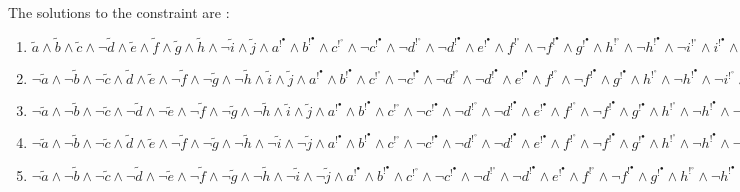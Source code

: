 \begin{BehExample}
The solutions to the constraint are :

\begin{enumerate}
\item $\tilde{a} \wedge \tilde{b} \wedge \tilde{c} \wedge \neg \tilde{d} \wedge \tilde{e} \wedge \tilde{f} \wedge \tilde{g} \wedge \tilde{h} \wedge \neg \tilde{i} \wedge \tilde{j} \wedge a^{!^\bullet} \wedge b^{!^\bullet} \wedge c^{!^\circ} \wedge \neg c^{!^\bullet} \wedge \neg d^{!^\circ} \wedge \neg d^{!^\bullet} \wedge e^{!^\bullet} \wedge f^{!^\circ} \wedge \neg f^{!^\bullet} \wedge g^{!^\bullet} \wedge h^{!^\circ} \wedge \neg h^{!^\bullet} \wedge \neg i^{!^\circ} \wedge i^{!^\bullet} \wedge j^{!^\bullet}$
\item $\neg \tilde{a} \wedge \neg \tilde{b} \wedge \neg \tilde{c} \wedge \tilde{d} \wedge \tilde{e} \wedge \neg \tilde{f} \wedge \neg \tilde{g} \wedge \neg \tilde{h}  \wedge \tilde{i} \wedge \tilde{j}  \wedge a^{!^\bullet} \wedge b^{!^\bullet} \wedge c^{!^\circ} \wedge \neg c^{!^\bullet} \wedge \neg d^{!^\circ} \wedge \neg d^{!^\bullet} \wedge e^{!^\bullet} \wedge f^{!^\circ} \wedge \neg f^{!^\bullet} \wedge g^{!^\bullet} \wedge h^{!^\circ} \wedge \neg h^{!^\bullet} \wedge \neg i^{!^\circ} \wedge i^{!^\bullet} \wedge j^{!^\bullet} \wedge a^{c^\triangleright}$
\item $\neg \tilde{a} \wedge \neg \tilde{b} \wedge \neg \tilde{c} \wedge \neg \tilde{d} \wedge \neg \tilde{e} \wedge \neg \tilde{f} \wedge \neg \tilde{g} \wedge \neg \tilde{h} \wedge \tilde{i} \wedge \tilde{j}  \wedge a^{!^\bullet} \wedge b^{!^\bullet} \wedge c^{!^\circ} \wedge \neg c^{!^\bullet} \wedge \neg d^{!^\circ} \wedge \neg d^{!^\bullet} \wedge e^{!^\bullet} \wedge f^{!^\circ} \wedge \neg f^{!^\bullet} \wedge g^{!^\bullet} \wedge h^{!^\circ} \wedge \neg h^{!^\bullet} \wedge \neg i^{!^\circ} \wedge i^{!^\bullet} \wedge j^{!^\bullet} \wedge a^{c^\triangleright}$
\item $\neg \tilde{a} \wedge \neg \tilde{b} \wedge \neg \tilde{c} \wedge \tilde{d} \wedge \tilde{e} \wedge \neg \tilde{f} \wedge \neg \tilde{g} \wedge \neg \tilde{h} \wedge \neg \tilde{i} \wedge \neg \tilde{j}  \wedge a^{!^\bullet} \wedge b^{!^\bullet} \wedge c^{!^\circ} \wedge \neg c^{!^\bullet} \wedge \neg d^{!^\circ} \wedge \neg d^{!^\bullet} \wedge e^{!^\bullet} \wedge f^{!^\circ} \wedge \neg f^{!^\bullet} \wedge g^{!^\bullet} \wedge h^{!^\circ} \wedge \neg h^{!^\bullet} \wedge \neg i^{!^\circ} \wedge i^{!^\bullet} \wedge j^{!^\bullet} \wedge a^{c^\triangleright}$
\item $\neg \tilde{a} \wedge \neg \tilde{b} \wedge \neg \tilde{c} \wedge \neg \tilde{d} \wedge \neg \tilde{e} \wedge \neg \tilde{f} \wedge \neg \tilde{g} \wedge \neg \tilde{h} \wedge \neg \tilde{i} \wedge \neg \tilde{j}  \wedge a^{!^\bullet} \wedge b^{!^\bullet} \wedge c^{!^\circ} \wedge \neg c^{!^\bullet} \wedge \neg d^{!^\circ} \wedge \neg d^{!^\bullet} \wedge e^{!^\bullet} \wedge f^{!^\circ} \wedge \neg f^{!^\bullet} \wedge g^{!^\bullet} \wedge h^{!^\circ} \wedge \neg h^{!^\bullet} \wedge \neg i^{!^\circ} \wedge i^{!^\bullet} \wedge j^{!^\bullet} \wedge a^{c^\triangleright}$
\end{enumerate}
\end{BehExample}

